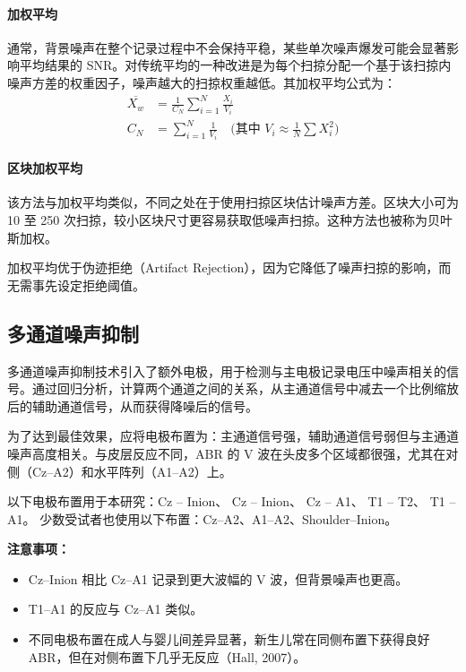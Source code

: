 \paragraph*{加权平均}
通常，背景噪声在整个记录过程中不会保持平稳，某些单次噪声爆发可能会显著影响平均结果的 SNR。对传统平均的一种改进是为每个扫掠分配一个基于该扫掠内噪声方差的权重因子，噪声越大的扫掠权重越低。其加权平均公式为：
\begin{align}
\overline{X_w} &= \frac{1}{C_N} \sum_{i=1}^N \frac{X_i}{V_i} \\
C_N &= \sum_{i=1}^N \frac{1}{V_i} \quad \text{(其中 } V_i \approx \frac{1}{N}\sum X_i^2 \text{)}
\end{align}

\paragraph*{区块加权平均}
该方法与加权平均类似，不同之处在于使用扫掠区块估计噪声方差。区块大小可为 10 至 250 次扫掠，较小区块尺寸更容易获取低噪声扫掠。这种方法也被称为贝叶斯加权。

加权平均优于伪迹拒绝（Artifact Rejection），因为它降低了噪声扫掠的影响，而无需事先设定拒绝阈值。

\subsection*{多通道噪声抑制}

多通道噪声抑制技术引入了额外电极，用于检测与主电极记录电压中噪声相关的信号。通过回归分析，计算两个通道之间的关系，从主通道信号中减去一个比例缩放后的辅助通道信号，从而获得降噪后的信号。

为了达到最佳效果，应将电极布置为：主通道信号强，辅助通道信号弱但与主通道噪声高度相关。与皮层反应不同，ABR 的 V 波在头皮多个区域都很强，尤其在对侧（Cz–A2）和水平阵列（A1–A2）上。

以下电极布置用于本研究：Cz – Inion、 Cz – Inion、 Cz – A1、  T1 – T2、 T1 – A1。
少数受试者也使用以下布置：Cz–A2、A1–A2、Shoulder–Inion。

\textbf{注意事项：}
\begin{itemize}
    \item Cz–Inion 相比 Cz–A1 记录到更大波幅的 V 波，但背景噪声也更高。
    \item T1–A1 的反应与 Cz–A1 类似。
    \item 不同电极布置在成人与婴儿间差异显著，新生儿常在同侧布置下获得良好 ABR，但在对侧布置下几乎无反应（Hall, 2007\cite{hall2007new}）。
\end{itemize}

